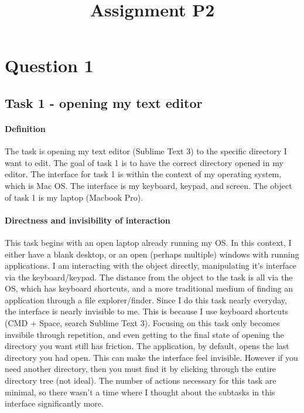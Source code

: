 

\title{Assignment P2\\}



\maketitle
\thispagestyle{fancy}

\section{Question 1}

\subsection{Task 1 - opening my text editor}

\paragraph{Definition}

The task is opening my text editor (Sublime Text 3) to the specific directory I want to edit. The goal of task 1 is to have the correct directory opened in my editor. The interface for task 1 is within the context of my operating system, which is Mac OS. The interface is my keyboard, keypad, and screen. The object of task 1 is my laptop (Macbook Pro).

\paragraph{Directness and invisibility of interaction}
This task begins with an open laptop already running my OS. In this context, I either have a blank desktop, or an open (perhaps multiple) windows with running applications. I am interacting with the object directly, manipulating it's interface via the keyboard/keypad. The distance from the object to the task is all via the OS, which has keyboard shortcuts, and a more traditional medium of finding an application through a file explorer/finder. Since I do this task nearly everyday, the interface is nearly invisible to me. This is because I use keyboard shortcuts (CMD + Space, search Sublime Text 3). Focusing on this task only becomes invsibile through repetition, and even getting to the final state of opening the directory you want still has friction. The application, by default, opens the last directory you had open. This can make the interface feel invisible. However if you need another directory, then you must find it by clicking through the entire directory tree (not ideal). The number of actions necessary for this task are minimal, so there wasn't a time where I thought about the subtasks in this interface significantly more.

